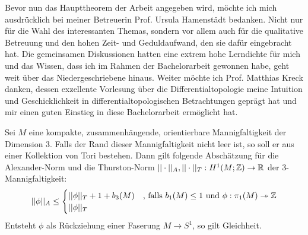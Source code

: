     Bevor nun das Haupttheorem der Arbeit angegeben wird, möchte ich mich ausdrücklich bei meiner Betreuerin Prof. Ursula Hamenstädt bedanken. Nicht nur für die Wahl des interessanten Themas, sondern vor allem auch für die qualitative Betreuung und den hohen Zeit- und Geduldaufwand, den sie dafür eingebracht hat. Die gemeinsamen Diskussionen hatten eine extrem hohe Lerndichte für mich und das Wissen, dass ich im Rahmen der Bachelorarbeit gewonnen habe, geht weit über das Niedergeschriebene hinaus. Weiter möchte ich Prof. Matthias Kreck danken, dessen exzellente Vorlesung über die Differentialtopologie meine Intuition und Geschicklichkeit in differentialtopologischen Betrachtungen geprägt hat und mir einen guten Einstieg in diese Bachelorarbeit ermöglicht hat.
\vfill
    \begin{thm}[McMullen]
    \label{thm:haupttheorem}
    	Sei $M$ eine kompakte, zusammenhängende, orientierbare Mannigfaltigkeit der Dimension 3. Falls der Rand dieser Mannigfaltigkeit nicht leer ist, so soll er aus einer Kollektion von Tori bestehen. Dann gilt folgende Abschätzung für die Alexander-Norm und die Thurston-Norm $||\cdot||_A ,||\cdot||_T : H^1(M;\mathbb{Z}) \to \mathbb{R}$ der 3-Mannigfaltigkeit:
    	\[
    		||\phi||_A \leq 
    		\begin{cases}
    			||\phi||_T + 1+ b_3(M) &\text{, falls } b_1(M)\leq 1 \text{ und } \phi: \pi_1(M) \twoheadrightarrow \mathbb{Z} \\
    			||\phi||_T &
    		\end{cases}
    	\]
    	Entsteht $\phi$ als Rückziehung einer Faserung $M\to S^1$, so gilt Gleichheit.
    \end{thm}
    \vfill